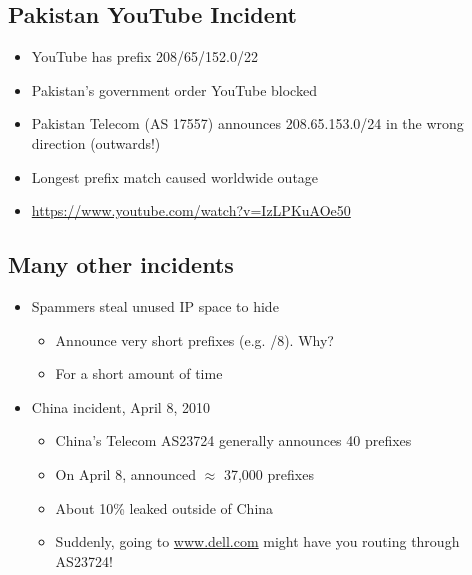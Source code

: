 \subsection{Pakistan YouTube Incident}
\begin{itemize}
    \item YouTube has prefix 208/65/152.0/22
    \item Pakistan's government order YouTube blocked
    \item Pakistan Telecom (AS 17557) announces 208.65.153.0/24 in the wrong direction (outwards!)
    \item Longest prefix match caused worldwide outage
    \item \url{https://www.youtube.com/watch?v=IzLPKuAOe50}
\end{itemize}

\subsection{Many other incidents}
\begin{itemize}
    \item Spammers steal unused IP space to hide
          \begin{itemize}
              \item Announce very short prefixes (e.g. /8). Why?
              \item For a short amount of time
          \end{itemize}
    \item China incident, April 8, 2010
          \begin{itemize}
              \item China's Telecom AS23724 generally announces 40 prefixes
              \item On April 8, announced $\approx$ 37,000 prefixes
              \item About 10\% leaked outside of China
              \item Suddenly, going to \url{www.dell.com} might have you routing through AS23724!
          \end{itemize}
\end{itemize}

